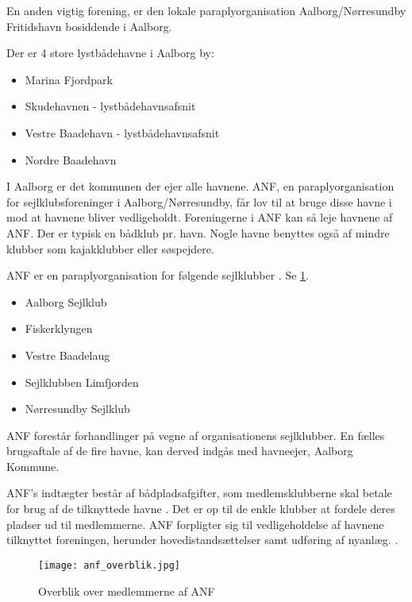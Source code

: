 En anden vigtig forening, er den lokale paraplyorganisation Aalborg/Nørresundby Fritidshavn bosiddende i Aalborg.

Der er 4 store lystbådehavne i Aalborg by:
\begin{itemize}[noitemsep]
    \item Marina Fjordpark
    \item Skudehavnen - lystbådehavnsafsnit
    \item Vestre Baadehavn - lystbådehavnsafsnit
    \item Nordre Baadehavn
\end{itemize}

I Aalborg er det kommunen der ejer alle havnene. ANF, en paraplyorganisation for sejlklubsforeninger i Aalborg/Nørresundby, får lov til at bruge disse havne i mod at havnene bliver vedligeholdt. Foreningerne i ANF kan så leje havnene af ANF. Der er typisk en bådklub pr. havn. Nogle havne benyttes også af mindre klubber som kajakklubber eller søspejdere.\cite{int_vb_sl}

ANF er en paraplyorganisation for følgende sejlklubber \cite{anf_havnereglement}. Se \cref{fig:anf_overblik}.
\begin{itemize}[noitemsep]
	\item Aalborg Sejlklub
	\item Fiskerklyngen
	\item Vestre Baadelaug
	\item Sejlklubben Limfjorden
	\item Nørresundby Sejlklub
\end{itemize}
 
ANF forestår forhandlinger på vegne af organisationens sejlklubber. En fælles brugsaftale af de fire havne, kan derved indgås med havneejer, Aalborg Kommune.

ANF's indtægter består af bådpladsafgifter, som medlemsklubberne skal betale for brug af de tilknyttede havne \cite{anf_budget_2013}. Det er op til de enkle klubber at fordele deres pladser ud til medlemmerne. ANF forpligter sig til vedligeholdelse af havnene tilknyttet foreningen, herunder hovedistandsættelser samt udføring af nyanlæg. \cite{anf_brugsaftale_2012}.

\begin{figure}
  \centering
  \texttt{[image: anf\_overblik.jpg]}
 	\caption{Overblik over medlemmerne af ANF} 	\label{fig:anf_overblik}
\end{figure}



